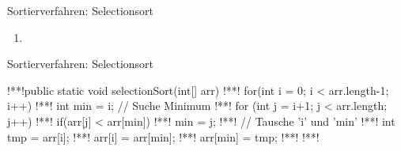 \begin{frame}{Sortierverfahren: Selectionsort}
\begin{center}
\begin{minipage}{0.9\linewidth}
\begin{multicols}{2}
\begin{enumerate}[<+(1)->]
                    \item {}
                \end{enumerate}
            \end{multicols}
        \end{minipage}
    \end{center}
\end{frame}

\begin{frame}[fragile,c]{Sortierverfahren: Selectionsort}
    \begin{plainjava}
!**!public static void selectionSort(int[] arr) {
!**!    for(int i = 0; i < arr.length-1; i++) {
!**!        int min = i; // Suche Minimum
!**!        for (int j = i+1; j < arr.length; j++)
!**!            if(arr[j] < arr[min])
!**!                min = j;
!**!        // Tausche 'i' und 'min'
!**!        int tmp = arr[i];
!**!        arr[i] = arr[min];
!**!        arr[min] = tmp;
!**!    }
!**!}
    \end{plainjava}
\end{frame}

